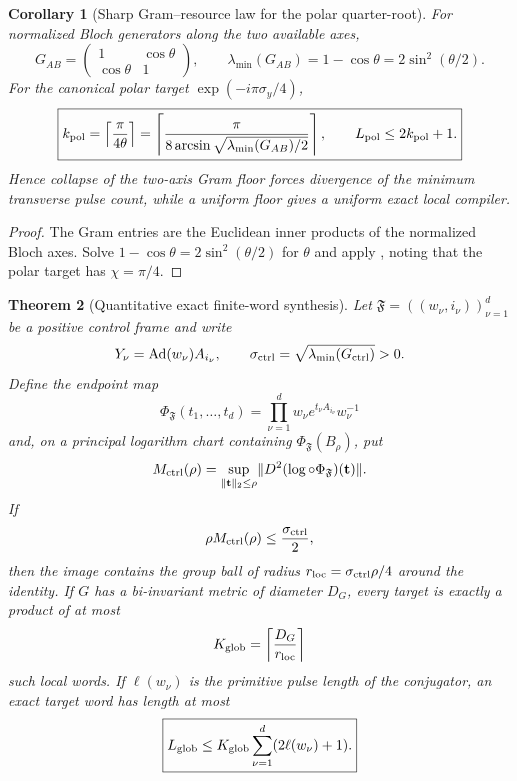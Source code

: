 \documentclass[11pt]{article}
\newtheorem{theorem}{Theorem}[section]
\newtheorem{corollary}[theorem]{Corollary}
\theoremstyle{definition}
\theoremstyle{remark}
\newcommand{\Ad}{\operatorname{Ad}}
\newcommand{\norm}[1]{\lVert#1\rVert}
\begin{document}
\begin{corollary}[Sharp Gram--resource law for the polar quarter-root]
\label{cor:polar-Gram-resource-master}
For normalized Bloch generators along the two available axes,
\[
  G_{AB}=\begin{pmatrix}1&\cos\theta\\ \cos\theta&1\end{pmatrix},
  \qquad
  \lambda_{\min}(G_{AB})=1-\cos\theta
  =2\sin^2(\theta/2).
\]
For the canonical polar target $\exp(-i\pi\sigma_y/4)$,
\begin{equation}
  \boxed{
  k_{\rm pol}
  =\left\lceil\frac{\pi}{4\theta}\right\rceil
  =\left\lceil
    \frac{\pi}{8\arcsin\sqrt{\lambda_{\min}(G_{AB})/2}}
   \right\rceil,
  \qquad L_{\rm pol}\le2k_{\rm pol}+1.}
  \label{eq:polar-Gram-resource-master}
\end{equation}
Hence collapse of the two-axis Gram floor forces divergence of the minimum
transverse pulse count, while a uniform floor gives a uniform exact local
compiler.
\end{corollary}

\begin{proof}
The Gram entries are the Euclidean inner products of the normalized Bloch axes.
Solve $1-\cos\theta=2\sin^2(\theta/2)$ for $\theta$ and apply
, noting that the polar target has
$\chi=\pi/4$.
\end{proof}



\begin{theorem}[Quantitative exact finite-word synthesis]
\label{thm:quantitative-control-word-master}
Let $\mathfrak F=((w_\nu,i_\nu))_{\nu=1}^{d}$ be a positive control frame and
write
\[
 Y_\nu=\Ad(w_\nu)A_{i_\nu},
 \qquad
 \sigma_{\rm ctrl}=\sqrt{\lambda_{\min}(G_{\rm ctrl})}>0.
\]
Define the endpoint map
\[
 \Phi_{\mathfrak F}(t_1,\ldots,t_d)
 =\prod_{\nu=1}^{d}w_\nu e^{t_\nu A_{i_\nu}}w_\nu^{-1}
\]
and, on a principal logarithm chart containing
$\Phi_{\mathfrak F}(B_\rho)$, put
\[
 M_{\rm ctrl}(\rho)
 =\sup_{\norm{\mathbf t}_2\le\rho}
   \norm{D^2(\log\circ\Phi_{\mathfrak F})(\mathbf t)}.
\]
If
\[
 \rho M_{\rm ctrl}(\rho)\le\frac{\sigma_{\rm ctrl}}2,
\]
then the image contains the group ball of radius
$r_{\rm loc}=\sigma_{\rm ctrl}\rho/4$ around the identity.  If $G$ has a
bi-invariant metric of diameter $D_G$, every target is exactly a product of at
most
\[
 K_{\rm glob}=\left\lceil\frac{D_G}{r_{\rm loc}}\right\rceil
\]
such local words.  If $\ell(w_\nu)$ is the primitive pulse length of the
conjugator, an exact target word has length at most
\begin{equation}
 \boxed{
 L_{\rm glob}\le
 K_{\rm glob}\sum_{\nu=1}^{d}(2\ell(w_\nu)+1).}
 \label{eq:quantitative-control-word-master}
\end{equation}
\end{theorem}
\end{document}
